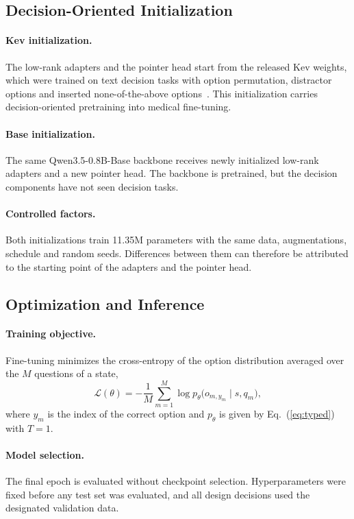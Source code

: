 \documentclass{article}
\begin{document}
\subsection{Decision-Oriented Initialization}
\paragraph{Kev initialization.} The low-rank adapters and the pointer head start from the released Kev weights, which were trained on text decision tasks with option permutation, distractor options and inserted none-of-the-above options~\citep{palmer2026kev}. This initialization carries decision-oriented pretraining into medical fine-tuning.

\paragraph{Base initialization.} The same Qwen3.5-0.8B-Base backbone receives newly initialized low-rank adapters and a new pointer head. The backbone is pretrained, but the decision components have not seen decision tasks.

\paragraph{Controlled factors.} Both initializations train 11.35M parameters with the same data, augmentations, schedule and random seeds. Differences between them can therefore be attributed to the starting point of the adapters and the pointer head.

\subsection{Optimization and Inference}
\paragraph{Training objective.} Fine-tuning minimizes the cross-entropy of the option distribution averaged over the $M$ questions of a state,
\begin{equation}
  \mathcal{L}(\theta) = -\frac{1}{M}\sum_{m=1}^{M}\log p_\theta\big(o_{m,y_m}\mid s,q_m\big),
  \label{eq:loss}
\end{equation}
where $y_m$ is the index of the correct option and $p_\theta$ is given by Eq.~(\ref{eq:typed}) with $T=1$.

\paragraph{Model selection.} The final epoch is evaluated without checkpoint selection. Hyperparameters were fixed before any test set was evaluated, and all design decisions used the designated validation data.
\end{document}
